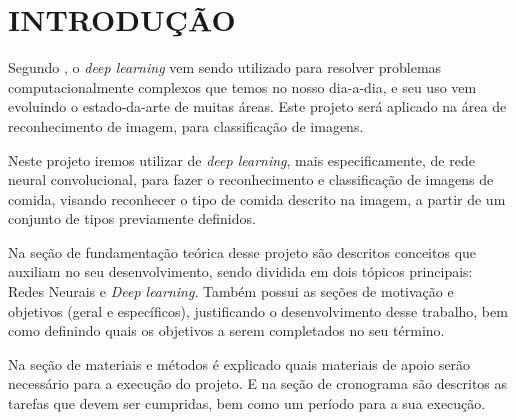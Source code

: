 
\chapter{INTRODUÇÃO}
\label{chap:introducao}
Segundo \cite{lecun2015deep}, o \textit{deep learning} vem sendo utilizado para resolver problemas computacionalmente complexos que temos no nosso dia-a-dia, e seu uso vem evoluindo o estado-da-arte de muitas áreas. Este projeto será aplicado na área de reconhecimento de imagem, para classificação de imagens.

\par Neste projeto iremos utilizar de \textit{deep learning}, mais especificamente, de rede neural convolucional, para fazer o reconhecimento e classificação de imagens de comida, visando reconhecer o tipo de comida descrito na imagem, a partir de um conjunto de tipos previamente definidos.
\par Na seção de fundamentação teórica desse projeto são descritos conceitos que auxiliam no seu desenvolvimento, sendo dividida em dois tópicos principais: Redes Neurais e \textit{Deep learning}. Também possui as seções de motivação e objetivos (geral e específicos), justificando o desenvolvimento desse trabalho, bem como definindo quais os objetivos a serem completados no seu término.
\par Na seção de materiais e métodos é explicado quais materiais de apoio serão necessário  para a execução do projeto. E na seção de cronograma são descritos as tarefas que devem ser cumpridas, bem como um período para a sua execução.